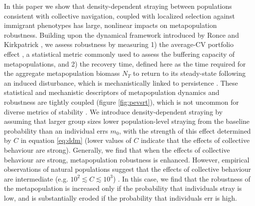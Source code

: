 \documentclass{revtex4}
\begin{document}
In this paper we show that density-dependent straying between populations consistent with collective navigation, coupled with localized selection against immigrant phenotypes has large, nonlinear impacts on metapopulation robustness.
Building upon the dynamical framework introduced by Ronce and Kirkpatrick \citep{Ronce:2001dp}, we assess robustness by measuring 
1) the average-CV portfolio effect \citep{Anderson:2013gb,Anonymous:2015gf}, a statistical metric commonly used to assess the buffering capacity of metapopulations, and
2) the recovery time, defined here as the time required for the aggregate metapopulation biomass $N_T$ to return to its steady-state following an induced disturbance, which is mechanistically linked to persistence \citep{Ovaskainen:2002il}.
These statistical and mechanistic descriptors of metapopulation dynamics and robustness are tightly coupled (figure \ref{fig:pevsrt}), which is not uncommon for diverse metrics of stability \citep{Donohue:2013iu}.
We introduce density-dependent straying by assuming that larger group sizes lower population-level straying from the baseline probability than an individual errs $m_0$, with the strength of this effect determined by $C$ in equation \ref{eq:ddm} (lower values of $C$ indicate that the effects of collective behaviour are strong).
Generally, we find that when the effects of collective behaviour are strong, metapopulation robustness is enhanced.
However, empirical observations of natural populations suggest that the effects of collective behaviour are intermediate (e.g. $10^{2} \lesssim C \lesssim 10^3$) \citep{Berdahl:2014bl,Berdahl:2016dx}.
In this case, we find that the robustness of the metapopulation is increased only if the probability that individuals stray is low, and is substantially eroded if the probability that individuals err is high.


\end{document}
